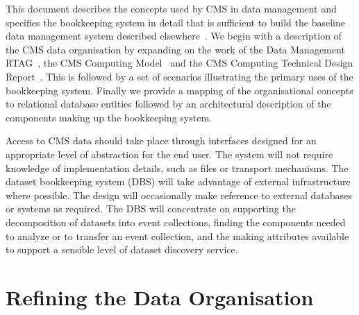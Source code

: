 \documentclass{cmspaper}
\begin{document}
This document describes the concepts used by CMS in data management and
specifies the bookkeeping system in detail that is sufficient to build the
baseline data management system described elsewhere~\cite{dmman}.  We begin
with a description of the CMS data organisation by expanding on the work of
the Data Management RTAG~\cite{rtag7}, the CMS Computing Model~\cite{CM} and
the CMS Computing Technical Design Report~\cite{CTDR}.
This is followed by a set of scenarios illustrating the primary uses of the
bookkeeping system.  Finally we provide a mapping of the organisational
concepts to relational database entities followed by an architectural
description of the components making up the bookkeeping system.

Access to CMS data should take place through interfaces designed for an 
appropriate level of abstraction for the end user.  The system will not require 
knowledge of implementation details, such as files or transport mechanisms. 
The dataset bookkeeping system (DBS) will take advantage of external infrastructure where 
possible.  The design will occasionally make 
reference to external databases or systems as required.  The DBS will 
concentrate on supporting the decomposition of datasets into event collections, 
finding the 
components needed to analyze or to transfer an event collection, and the making 
attributes available to support a sensible level of dataset discovery service.  


\section{Refining the Data Organisation}
\end{document}
